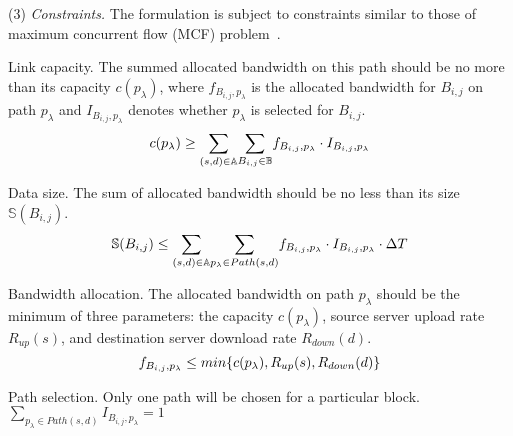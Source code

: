 \noindent(3) {\em Constraints.}
The formulation is subject to constraints similar to those of maximum concurrent flow (MCF) problem~\cite{garg2007faster,reed2012traffic}.

\begin{packeditemize}
\item Link capacity. The summed allocated bandwidth on this path should be no more than its capacity $c(p_\lambda)$, where $f_{B_{i,j},p_\lambda}$ is the allocated bandwidth for $B_{i,j}$ on path $p_\lambda$ and $I_{B_{i,j},p_\lambda}$ denotes whether $p_\lambda$ is selected for $B_{i,j}$.
\begin{equation}
c(p_\lambda) \geq  \displaystyle{\sum_{(s,d)\in \mathbb{A}}} \displaystyle{\sum_{B_{i,j} \in \mathbb{B}}} f_{B_{i,j},p_\lambda} \cdot I_{B_{i,j},p_\lambda}\\
\end{equation}

\item Data size. The sum of allocated bandwidth should be no less than its size $\mathbb{S}(B_{i,j})$.
\begin{equation}
\mathbb{S}(B_{i,j}) \leq  \displaystyle{\sum_{(s,d)\in \mathbb{A}}} \displaystyle{\sum_{p_{\lambda}\in Path(s,d)}} f_{B_{i,j},p_\lambda} \cdot I_{B_{i,j},p_\lambda} \cdot \Delta T\\
\end{equation}

\item Bandwidth allocation. The allocated bandwidth on path $p_\lambda$ should be the minimum of three parameters: the capacity $c(p_\lambda)$, source server upload rate $R_{up}(s)$, and destination server download rate $R_{down}(d)$.
\begin{equation}
f_{B_{i,j},p_\lambda} \leq  min \{c(p_\lambda),R_{up}(s),R_{down}(d)\}\\
\end{equation}

\item Path selection. Only one path will be chosen for a particular block.
$\displaystyle{\sum_{p_\lambda \in Path(s,d)}} I_{B_{i,j},p_\lambda} = 1$
\end{packeditemize}
